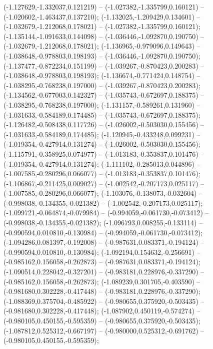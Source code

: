  (-1.127629,-1.332037,0.121219) -- (-1.027382,-1.335799,0.160121) -- (-1.020602,-1.463437,0.137210);
 (-1.132025,-1.209429,0.134601) -- (-1.032679,-1.212068,0.178021) -- (-1.027382,-1.335799,0.160121);
 (-1.135144,-1.091633,0.144098) -- (-1.036446,-1.092870,0.190750) -- (-1.032679,-1.212068,0.178021);
 (-1.136965,-0.979096,0.149643) -- (-1.038648,-0.978803,0.198193) -- (-1.036446,-1.092870,0.190750);
 (-1.137477,-0.872234,0.151199) -- (-1.039267,-0.870423,0.200283) -- (-1.038648,-0.978803,0.198193);
 (-1.136674,-0.771424,0.148754) -- (-1.038295,-0.768238,0.197000) -- (-1.039267,-0.870423,0.200283);
 (-1.134562,-0.677003,0.142327) -- (-1.035743,-0.672697,0.188375) -- (-1.038295,-0.768238,0.197000);
 (-1.131157,-0.589261,0.131960) -- (-1.031633,-0.584189,0.174485) -- (-1.035743,-0.672697,0.188375);
 (-1.126482,-0.508438,0.117726) -- (-1.026002,-0.503030,0.155456) -- (-1.031633,-0.584189,0.174485);
 (-1.120945,-0.433248,0.099231) -- (-1.019354,-0.427914,0.131274) -- (-1.026002,-0.503030,0.155456);
 (-1.115791,-0.358925,0.074977) -- (-1.013183,-0.353837,0.101476) -- (-1.019354,-0.427914,0.131274);
 (-1.111102,-0.285013,0.044896) -- (-1.007585,-0.280296,0.066077) -- (-1.013183,-0.353837,0.101476);
 (-1.106867,-0.211425,0.009027) -- (-1.002542,-0.207173,0.025117) -- (-1.007585,-0.280296,0.066077);
 (-1.103076,-0.138073,-0.032604) -- (-0.998038,-0.134355,-0.021382) -- (-1.002542,-0.207173,0.025117);
 (-1.099721,-0.064874,-0.079984) -- (-0.994059,-0.061730,-0.073412) -- (-0.998038,-0.134355,-0.021382);
 (-1.096793,0.008255,-0.133114) -- (-0.990594,0.010810,-0.130984) -- (-0.994059,-0.061730,-0.073412);
 (-1.094286,0.081397,-0.192008) -- (-0.987631,0.083371,-0.194124) -- (-0.990594,0.010810,-0.130984);
 (-1.092194,0.154632,-0.256691) -- (-0.985162,0.156058,-0.262873) -- (-0.987631,0.083371,-0.194124);
 (-1.090514,0.228042,-0.327201) -- (-0.983181,0.228976,-0.337290) -- (-0.985162,0.156058,-0.262873);
 (-1.089239,0.301705,-0.403590) -- (-0.981680,0.302228,-0.417448) -- (-0.983181,0.228976,-0.337290);
 (-1.088369,0.375704,-0.485922) -- (-0.980655,0.375920,-0.503435) -- (-0.981680,0.302228,-0.417448);
 (-1.087902,0.450119,-0.574274) -- (-0.980105,0.450155,-0.595359) -- (-0.980655,0.375920,-0.503435);
 (-1.087812,0.525312,-0.667197) -- (-0.980000,0.525312,-0.691762) -- (-0.980105,0.450155,-0.595359);
